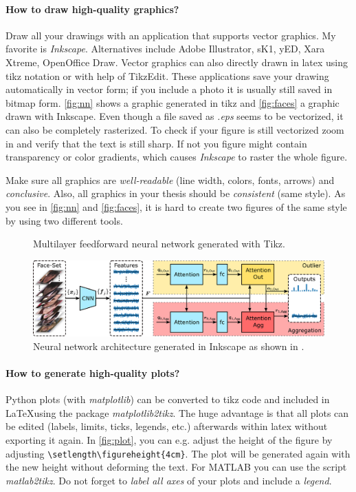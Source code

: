 \paragraph*{How to draw high-quality graphics?}
Draw all your drawings with an application that supports vector graphics. My favorite is \textit{Inkscape}. Alternatives include Adobe Illustrator, sK1, yED, Xara Xtreme, OpenOffice Draw. Vector graphics can also directly drawn in latex using tikz notation or with help of TikzEdit.
These applications save your drawing automatically in vector form; if you include a photo it is usually still saved in bitmap form. \autoref{fig:nn} shows a graphic generated in tikz and \autoref{fig:faces} a graphic drawn with Inkscape. Even though a file saved as \textit{.eps} seems to be vectorized, it can also be completely rasterized. To check if your figure is still vectorized zoom in and verify that the text is still sharp. If not you figure might contain transparency or color gradients, which causes \textit{Inkscape} to raster the whole figure.

Make sure all graphics are \textit{well-readable} (line width, colors, fonts, arrows) and \textit{conclusive}. Also, all graphics in your thesis should be \textit{consistent} (same style). As you see in \autoref{fig:nn} and \autoref{fig:faces}, it is hard to create two figures of the same style by using two different tools.

\begin{figure}[H]
  \centering
  \resizebox{.65\textwidth}{!}{
}
  \caption{Multilayer feedforward neural network generated with Tikz.}
  \label{fig:nn}
\end{figure}

\begin{figure}[H]
  \centering
\includegraphics[width=0.87\linewidth]{figures/network.eps}
  \caption{Neural network architecture generated in Inkscape as shown in \cite{hoerman2019ORNAN}.}
  \label{fig:faces}
\end{figure}

\paragraph*{How to generate high-quality plots?}
Python plots (with \textit{matplotlib}) can be converted to tikz code and included in \LaTeX using the package \textit{matplotlib2tikz}.  The huge advantage is that all plots can be edited (labels, limits, ticks, legends, etc.) afterwards within latex without exporting it again. In  \autoref{fig:plot}, you can e.g. adjust the height of the figure by adjusting \verb'\setlength\figureheight{4cm}'. The plot will be generated again with the new height without deforming the text. For MATLAB you can use the script \textit{matlab2tikz}. Do not forget to \textit{label all axes} of your plots and include a \textit{legend}.

